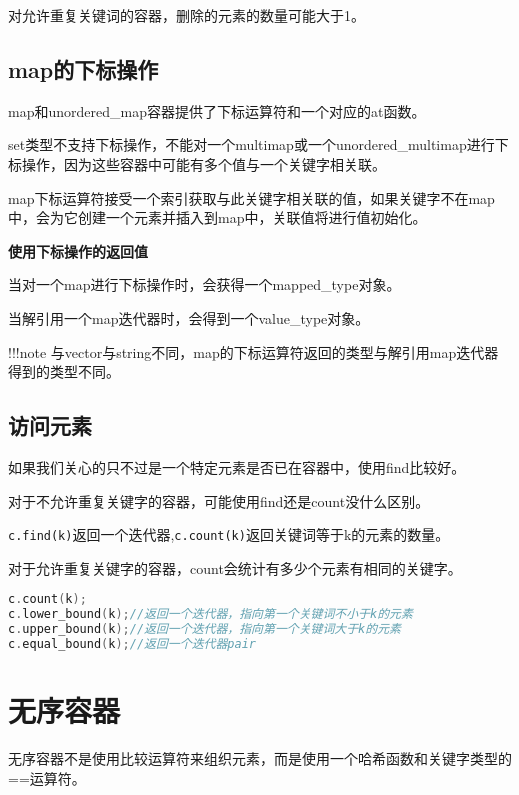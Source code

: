 \documentclass[
  a4paper,
  oneside,tablecaptionabove
]{scrbook}
\begin{document}
对允许重复关键词的容器，删除的元素的数量可能大于1。

\subsection{map的下标操作}\label{mapux7684ux4e0bux6807ux64cdux4f5c}

map和unordered\_map容器提供了下标运算符和一个对应的at函数。

set类型不支持下标操作，不能对一个multimap或一个unordered\_multimap进行下标操作，因为这些容器中可能有多个值与一个关键字相关联。

map下标运算符接受一个索引获取与此关键字相关联的值，如果关键字不在map中，会为它创建一个元素并插入到map中，关联值将进行值初始化。

\textbf{使用下标操作的返回值}

当对一个map进行下标操作时，会获得一个mapped\_type对象。

当解引用一个map迭代器时，会得到一个value\_type对象。

!!!note
与vector与string不同，map的下标运算符返回的类型与解引用map迭代器得到的类型不同。

\subsection{访问元素}\label{ux8bbfux95eeux5143ux7d20}

如果我们关心的只不过是一个特定元素是否已在容器中，使用find比较好。

对于不允许重复关键字的容器，可能使用find还是count没什么区别。

\lstinline!c.find(k)!返回一个迭代器,\lstinline!c.count(k)!返回关键词等于k的元素的数量。

对于允许重复关键字的容器，count会统计有多少个元素有相同的关键字。

\begin{lstlisting}[language={C++}]
c.count(k);
c.lower_bound(k);//返回一个迭代器，指向第一个关键词不小于k的元素
c.upper_bound(k);//返回一个迭代器，指向第一个关键词大于k的元素
c.equal_bound(k);//返回一个迭代器pair
\end{lstlisting}

\section{无序容器}\label{ux65e0ux5e8fux5bb9ux5668}

无序容器不是使用比较运算符来组织元素，而是使用一个哈希函数和关键字类型的==运算符。
\end{document}
